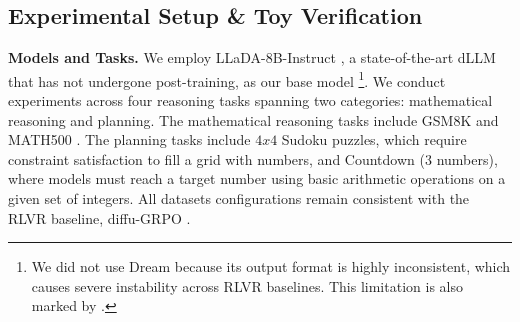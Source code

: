 \documentclass{article}
\begin{document}
\subsection{Experimental Setup \& Toy Verification} \label{sec4.1}


\textbf{Models and Tasks.} We employ LLaDA-8B-Instruct \citep{nie2025large}, a state-of-the-art dLLM that has not undergone post-training, as our base model \footnote{We did not use Dream \citep{ye2025dream} because its output format is highly inconsistent, which causes severe
instability across RLVR baselines. This limitation is also marked by \citep{pan2025d}.}. We conduct experiments across four reasoning tasks spanning two categories: mathematical reasoning and planning. The mathematical reasoning tasks include GSM8K \citep{cobbe2021training} and MATH500 \citep{lightman2023let}. The planning tasks include $4x4$ Sudoku puzzles, which require
constraint satisfaction to fill a grid with numbers, and Countdown ($3$ numbers), where models must reach a target number using basic arithmetic operations on a given set of integers. All datasets configurations remain consistent with the RLVR baseline, diffu-GRPO \citep{zhao2025d1}. 
\end{document}
